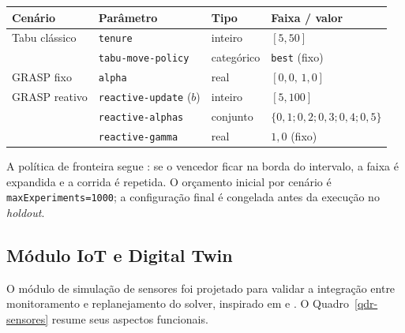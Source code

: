 \documentclass[10pt, a4paper]{article}
\begin{document}
\begin{quadro}[H]
\centering
\caption{Espa\c{c}o de busca da calibra\c{c}\~ao irace (pr\'e-registrado)}
\label{qdr-irace}
\small
\begin{tabular}{|l|l|l|l|}
\hline
\rowcolor{gray!20}\textbf{Cen\'ario} & \textbf{Par\^ametro} & \textbf{Tipo} & \textbf{Faixa / valor} \\
\hline
Tabu cl\'assico & \texttt{tenure} & inteiro & $[5, 50]$ \\
                & \texttt{tabu-move-policy} & categ\'orico & \texttt{best} (fixo) \\
\hline
GRASP fixo & \texttt{alpha} & real & $[0{,}0,\, 1{,}0]$ \\
\hline
GRASP reativo & \texttt{reactive-update} ($b$) & inteiro & $[5, 100]$ \\
              & \texttt{reactive-alphas} & conjunto & $\{0{,}1; 0{,}2; 0{,}3; 0{,}4; 0{,}5\}$ \\
              & \texttt{reactive-gamma} & real & $1{,}0$ (fixo) \\
\hline
\end{tabular}
\end{quadro}

A pol\'itica de fronteira segue \citet{lopez2016}: se o vencedor ficar na borda do intervalo, a faixa \'e expandida e a corrida \'e repetida. O or\c{c}amento inicial por cen\'ario \'e \texttt{maxExperiments=1000}; a configura\c{c}\~ao final \'e congelada antes da execu\c{c}\~ao no \emph{holdout}.

\subsection{M\'odulo IoT e Digital Twin}
\label{sec-iot}

O m\'odulo de simula\c{c}\~ao de sensores foi projetado para validar a integra\c{c}\~ao entre monitoramento e replanejamento do solver, inspirado em \citet{lozano2018} e \citet{almeida2021}. O Quadro~\ref{qdr-sensores} resume seus aspectos funcionais.
\end{document}
